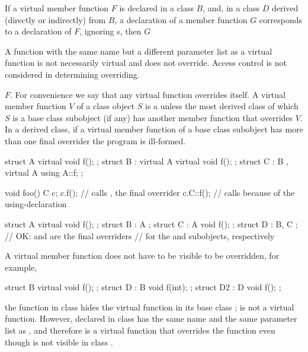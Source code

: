 \pnum
If a virtual member function $F$ is declared in a class $B$, and,
in a class $D$ derived (directly or indirectly) from $B$,
a declaration of a member function $G$
corresponds to a declaration of $F$,
ignoring s,
%
then $G$ 
\begin{footnote}
A function
with the same name but a different parameter list
as a virtual function is not necessarily virtual and
does not override. Access control is not considered in
determining overriding.
\end{footnote}
$F$.
For convenience we say that any virtual function overrides itself.
%
A virtual member function $V$ of a class object $S$ is a  unless the most derived class of which $S$ is a
base class subobject (if any) has another member function that overrides $V$.
In a derived class, if a virtual member function of a base class subobject
has more than one final overrider the program is ill-formed.
\begin{example}
\begin{codeblock}
struct A {
  virtual void f();
};
struct B : virtual A {
  virtual void f();
};
struct C : B , virtual A {
  using A::f;
};

void foo() {
  C c;
  c.f();            // calls , the final overrider
  c.C::f();         // calls  because of the using-declaration
}
\end{codeblock}
\end{example}

\begin{example}
\begin{codeblock}
struct A { virtual void f(); };
struct B : A { };
struct C : A { void f(); };
struct D : B, C { };            // OK:  and  are the final overriders
                                // for the  and  subobjects, respectively
\end{codeblock}
\end{example}

\pnum
\begin{note}
A virtual member function does not have to be visible to be overridden,
for example,
\begin{codeblock}
struct B {
  virtual void f();
};
struct D : B {
  void f(int);
};
struct D2 : D {
  void f();
};
\end{codeblock}
the function  in class  hides the virtual
function  in its base class ;  is
not a virtual function. However,  declared in class
 has the same name and the same parameter list as
, and therefore is a virtual function that overrides the
function  even though  is not visible in
class .
\end{note}

